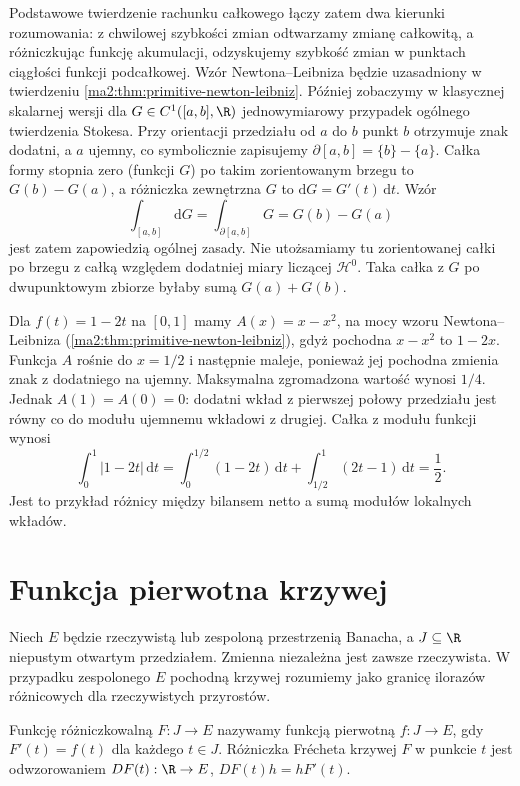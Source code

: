 Podstawowe twierdzenie rachunku całkowego
łączy zatem dwa kierunki rozumowania:
z chwilowej szybkości zmian odtwarzamy
zmianę całkowitą, a różniczkując funkcję
akumulacji, odzyskujemy szybkość zmian
w punktach ciągłości funkcji podcałkowej.
Wzór Newtona--Leibniza będzie uzasadniony
w twierdzeniu \ref{ma2:thm:primitive-newton-leibniz}.
Później zobaczymy w klasycznej skalarnej wersji
dla $G\in C^1([a,b],\R)$ jednowymiarowy
przypadek ogólnego twierdzenia Stokesa.
Przy orientacji przedziału od $a$ do $b$
punkt $b$ otrzymuje znak dodatni, a $a$
ujemny, co symbolicznie zapisujemy
$\partial[a,b]=\{b\}-\{a\}$. Całka formy
stopnia zero (funkcji $G$) po takim
zorientowanym brzegu to $G(b)-G(a)$,
a różniczka zewnętrzna $G$ to
$\mathrm dG=G'(t)\,\mathrm dt$.
Wzór
\[
 \int_{[a,b]}\mathrm dG
 =\int_{\partial[a,b]}G=G(b)-G(a)
\]
jest zatem zapowiedzią ogólnej zasady.
Nie utożsamiamy tu zorientowanej całki
po brzegu z całką względem dodatniej
miary liczącej $\mathcal H^0$. Taka
całka z $G$ po dwupunktowym zbiorze
byłaby sumą $G(a)+G(b)$.

\begin{przyklad}
\label{ma2:ex:primitive-signed-accumulation}
Dla $f(t)=1-2t$ na $[0,1]$ mamy
$A(x)=x-x^2$, na mocy wzoru
Newtona--Leibniza
(\ref{ma2:thm:primitive-newton-leibniz}),
gdyż pochodna $x-x^2$ to $1-2x$.
Funkcja $A$ rośnie do $x=1/2$ i następnie
maleje, ponieważ jej pochodna zmienia
znak z dodatniego na ujemny.
Maksymalna zgromadzona wartość wynosi $1/4$.
Jednak $A(1)=A(0)=0$: dodatni wkład
z pierwszej połowy przedziału jest równy
co do modułu ujemnemu wkładowi z drugiej.
Całka z modułu funkcji wynosi
\[
 \int_0^1|1-2t|\,\mathrm dt
 =\int_0^{1/2}(1-2t)\,\mathrm dt
 +\int_{1/2}^1(2t-1)\,\mathrm dt
 =\frac12.
\]
Jest to przykład różnicy między bilansem
netto a sumą modułów lokalnych wkładów.
\end{przyklad}

\section{Funkcja pierwotna krzywej}

Niech $E$ będzie rzeczywistą lub zespoloną
przestrzenią Banacha, a $J\subseteq\R$
niepustym otwartym przedziałem.
Zmienna niezależna jest zawsze rzeczywista.
W przypadku zespolonego $E$ pochodną krzywej
rozumiemy jako granicę ilorazów różnicowych
dla rzeczywistych przyrostów.

\begin{definicja}
\label{ma2:def:vector-primitive}
Funkcję różniczkowalną $F:J\to E$ nazywamy
funkcją pierwotną $f:J\to E$, gdy
$F'(t)=f(t)$ dla każdego $t\in J$.
Różniczka Frécheta krzywej $F$ w punkcie $t$
jest odwzorowaniem $DF(t):\R\to E$,
$DF(t)h=hF'(t)$.
\end{definicja}

